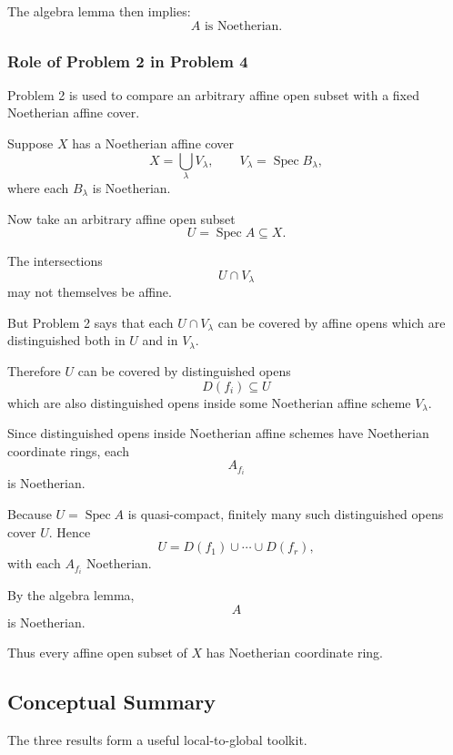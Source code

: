 \documentclass[12pt,a4paper]{article}
\DeclareMathOperator{\Spec}{Spec}
\providecommand{\Spec}{\operatorname{Spec}}
\theoremstyle{notespace}
\begin{document}
The algebra lemma then implies:
\[
A\text{ is Noetherian}.
\]

\subsubsection*{Role of Problem 2 in Problem 4}

Problem 2 is used to compare an arbitrary affine open subset with a fixed Noetherian affine cover.

Suppose \(X\) has a Noetherian affine cover
\[
X=\bigcup_\lambda V_\lambda,
\qquad
V_\lambda=\Spec B_\lambda,
\]
where each \(B_\lambda\) is Noetherian.

Now take an arbitrary affine open subset
\[
U=\Spec A\subseteq X.
\]

The intersections
\[
U\cap V_\lambda
\]
may not themselves be affine.

But Problem 2 says that each \(U\cap V_\lambda\) can be covered by affine opens which are distinguished both in \(U\) and in \(V_\lambda\).

Therefore \(U\) can be covered by distinguished opens
\[
D(f_i)\subseteq U
\]
which are also distinguished opens inside some Noetherian affine scheme \(V_\lambda\).

Since distinguished opens inside Noetherian affine schemes have Noetherian coordinate rings, each
\[
A_{f_i}
\]
is Noetherian.

Because \(U=\Spec A\) is quasi-compact, finitely many such distinguished opens cover \(U\). Hence
\[
U=D(f_1)\cup\cdots\cup D(f_r),
\]
with each \(A_{f_i}\) Noetherian.

By the algebra lemma,
\[
A
\]
is Noetherian.

Thus every affine open subset of \(X\) has Noetherian coordinate ring.

\subsection{Conceptual Summary}

The three results form a useful local-to-global toolkit.
\end{document}
